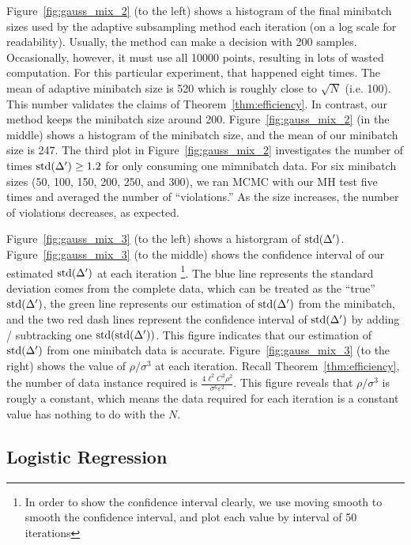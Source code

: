 \documentclass{article}
\begin{document}
Figure~\ref{fig:gauss_mix_2} (to the left) shows a histogram of the final minibatch sizes used by
the adaptive subsampling method each iteration (on a log scale for readability).  Usually, the method
can make a decision with 200 samples. Occasionally, however, it must use all 10000 points, resulting
in lots of wasted computation.  For this particular experiment, that happened eight times. The mean of adaptive minibatch size is 520 which is roughly close to $\sqrt{N}$ (i.e. 100). This number validates the claims of Theorem~\ref{thm:efficiency}. In
contrast, our method keeps the minibatch size around 200. Figure~\ref{fig:gauss_mix_2} (in the middle) shows a histogram of the minibatch size, and the mean of our minibatch size is 247. 
The third plot in Figure~\ref{fig:gauss_mix_2} investigates the number of times ${\rm std}(\Delta')
\ge 1.2$ for only consuming one mimnibatch data. For six minibatch sizes (50, 100, 150, 200, 250, and 300), we ran MCMC with
our MH test five times and averaged the number of ``violations.'' As the size increases, the
number of violations decreases, as expected.

Figure~\ref{fig:gauss_mix_3} (to the left) shows a historgram of ${\rm std}(\Delta')$. Figure~\ref{fig:gauss_mix_3} (to the middle) shows the confidence interval of our estimated ${\rm std}(\Delta')$ at each iteration \footnote{In order to show the confidence interval clearly, we use moving smooth to smooth the confidence interval, and plot each value by interval of 50 iterations}. The blue line represents the standard deviation comes from the complete data, which can be treated as the ``true'' ${\rm std}(\Delta')$, the green line represents our estimation of ${\rm std}(\Delta')$ from the minibatch, and the two red dash lines represent the confidence interval of ${\rm std}(\Delta')$ by adding / subtracking one ${\rm std(std(}\Delta'))$. This figure indicates that our estimation of ${\rm std}(\Delta')$ from one minibatch data is accurate. Figure~\ref{fig:gauss_mix_3} (to the right) shows the value of $\rho/\sigma^3$ at each iteration. Recall Theorem~\ref{thm:efficiency}, the number of data instance required is $\frac{4 \ell^2 C^2 \rho^2 }{\sigma^6 \varepsilon^2}$. This figure reveals that $\rho/\sigma^3$ is rougly a constant, which means the data required for each iteration is a constant value has nothing to do with the $N$.


\subsection{Logistic Regression}\label{ssec:logistic}
\end{document}
